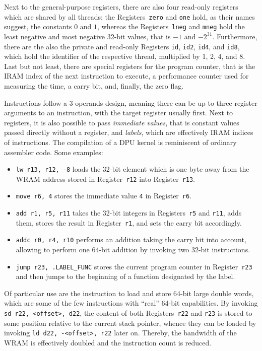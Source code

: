Next to the general-purpose registers, there are also four read-only registers which are shared by all threads:
the Registers~\lstinline|zero| and \lstinline|one| hold, as their names suggest, the constants \(0\) and \(1\), whereas the Registers~\lstinline|lneg| and \lstinline|mneg| hold the least negative and most negative 32-bit values, that is \(-1\) and \(-2^{31}\).
Furthermore, there are the also the private and read-only Registers \lstinline|id|, \lstinline|id2|, \lstinline|id4|, and \lstinline|id8|, which hold the identifier of the respective thread, multiplied by 1, 2, 4, and 8.
Last but not least, there are special registers for the program counter, that is the \ac{IRAM} index of the next instruction to execute, a performance counter used for measuring the time, a carry bit, and, finally, the zero flag.

Instructions follow a 3-operands design, meaning there can be up to three register arguments to an instruction, with the target register usually first.
Next to registers, it is also possible to pass \emph{immediate values}, that is constant values passed directly without a register, and \emph{labels}, which are effectively \ac{IRAM} indices of instructions.
The compilation of a \ac{DPU} kernel is reminiscent of ordinary assembler code.
Some examples:
\begin{itemize}
	\item
	\lstinline|lw r13, r12, -8| loads the 32-bit element which is one byte away from the \ac{WRAM} address stored in Register~\lstinline|r12| into Register~\lstinline|r13|.

	\item
	\lstinline|move r6, 4| stores the immediate value \lstinline|4| in Register~\lstinline|r6|.

	\item
	\lstinline|add r1, r5, r11| takes the 32-bit integers in Registers~\lstinline|r5| and \lstinline|r11|, adds them, stores the result in Register~\lstinline|r1|, and sets the carry bit accordingly.

	\item
	\lstinline|addc r0, r4, r10| performs an addition taking the carry bit into account, allowing to perform one 64-bit addition by invoking two 32-bit instructions.

	\item
	\lstinline|jump r23, .LABEL_FUNC| stores the current program counter in Register~\lstinline|r23| and then jumps to the beginning of a function designated by the label.
\end{itemize}
Of particular use are the instruction to load and store 64-bit large double words, which are some of the few instructions with \enquote{real} 64-bit capabilities.
By invoking \lstinline|sd r22, <offset>, d22|, the content of both Registers~\lstinline|r22| and \lstinline|r23| is stored to some position relative to the current stack pointer, whence they can be loaded by invoking \lstinline|ld d22, -<offset>, r22| later on.
Thereby, the bandwidth of the \ac{WRAM} is effectively doubled and the instruction count is reduced.

